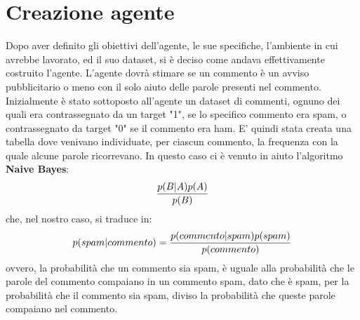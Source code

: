 \documentclass{report}
\begin{document}
    \chapter{Creazione agente}
    Dopo aver definito gli obiettivi dell'agente, le sue specifiche, l'ambiente in cui avrebbe lavorato, ed il suo dataset, si è deciso come andava effettivamente costruito l'agente.
    L'agente dovrà stimare se un commento è un avviso pubblicitario o meno con il solo aiuto delle parole presenti nel commento. Inizialmente è stato sottoposto all'agente 
    un dataset di commenti, ognuno dei quali era contrassegnato da un target "1", se lo specifico commento era spam, o contrassegnato da target "0" se il commento era ham.
    E' quindi stata creata una tabella dove venivano individuate, per ciascun commento,
    la frequenza con la quale alcune parole ricorrevano. In questo caso ci è venuto in aiuto l'algoritmo {\bfseries Naive Bayes}:
    \newline
    \begin{equation}\label{bho}
        { p(B|A)  p(A)\over p(B)}
    \end{equation}
    \newline
    che, nel nostro caso, si traduce in:
    \newline
    \begin{equation}\label{bho2}
        p(spam|commento) = { p(commento|spam)  p(spam)\over p(commento)}
    \end{equation}
    \newline
    ovvero, la probabilità che un commento sia spam, è uguale alla probabilità che le parole del commento compaiano in un commento spam, dato che è spam, per la probabilità 
    che il commento sia spam, diviso la probabilità che queste parole compaiano nel commento.
\end{document}
